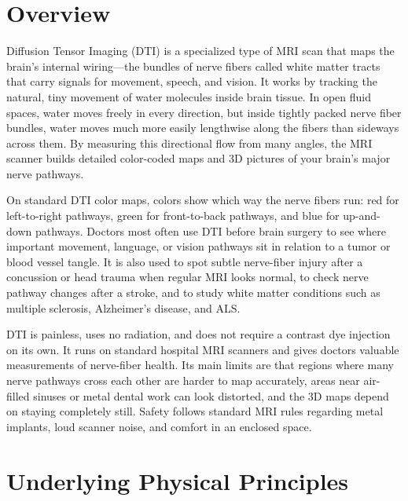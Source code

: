 \label{ch:infographic-sti}

\section{Overview}

Diffusion Tensor Imaging (DTI) is a specialized type of MRI scan that maps the brain's internal wiring---the bundles of nerve fibers called white matter tracts that carry signals for movement, speech, and vision. It works by tracking the natural, tiny movement of water molecules inside brain tissue. In open fluid spaces, water moves freely in every direction, but inside tightly packed nerve fiber bundles, water moves much more easily lengthwise along the fibers than sideways across them. By measuring this directional flow from many angles, the MRI scanner builds detailed color-coded maps and 3D pictures of your brain's major nerve pathways.

On standard DTI color maps, colors show which way the nerve fibers run: red for left-to-right pathways, green for front-to-back pathways, and blue for up-and-down pathways. Doctors most often use DTI before brain surgery to see where important movement, language, or vision pathways sit in relation to a tumor or blood vessel tangle. It is also used to spot subtle nerve-fiber injury after a concussion or head trauma when regular MRI looks normal, to check nerve pathway changes after a stroke, and to study white matter conditions such as multiple sclerosis, Alzheimer's disease, and ALS.

DTI is painless, uses no radiation, and does not require a contrast dye injection on its own. It runs on standard hospital MRI scanners and gives doctors valuable measurements of nerve-fiber health. Its main limits are that regions where many nerve pathways cross each other are harder to map accurately, areas near air-filled sinuses or metal dental work can look distorted, and the 3D maps depend on staying completely still. Safety follows standard MRI rules regarding metal implants, loud scanner noise, and comfort in an enclosed space.

\section{Underlying Physical Principles}

